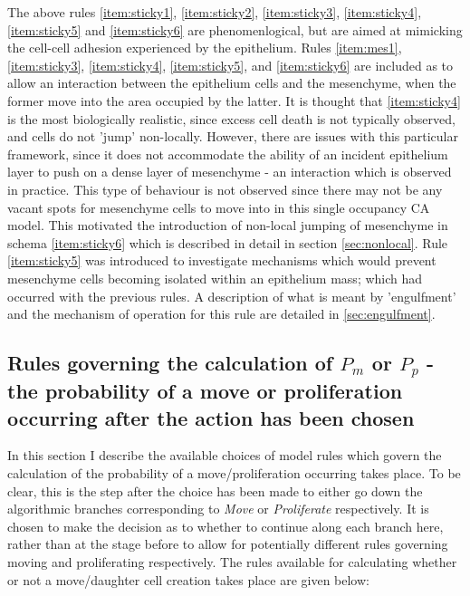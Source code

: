 \documentclass[pdftex,10pt,a4paper]{article}
\begin{document}
The above rules \ref{item:sticky1}, \ref{item:sticky2}, \ref{item:sticky3}, \ref{item:sticky4},\ref{item:sticky5} and \ref{item:sticky6} are phenomenlogical, but are aimed at mimicking the cell-cell adhesion experienced by the epithelium. Rules \ref{item:mes1}, \ref{item:sticky3}, \ref{item:sticky4}, \ref{item:sticky5}, and \ref{item:sticky6} are included as to allow an interaction between the epithelium cells and the mesenchyme, when the former move into the area occupied by the latter. It is thought that \ref{item:sticky4} is the most biologically realistic, since excess cell death is not typically observed, and cells do not 'jump' non-locally. However, there are issues with this particular framework, since it does not accommodate the ability of an incident epithelium layer to push on a dense layer of mesenchyme - an interaction which is observed in practice. This type of behaviour is not observed since there may not be any vacant spots for mesenchyme cells to move into in this single occupancy CA model. This motivated the introduction of non-local jumping of mesenchyme in schema \ref{item:sticky6} which is described in detail in section \ref{sec:nonlocal}. Rule \ref{item:sticky5} was introduced to investigate mechanisms which would prevent mesenchyme cells becoming isolated within an epithelium mass; which had occurred with the previous rules. A description of what is meant by 'engulfment' and the mechanism of operation for this rule are detailed in \ref{sec:engulfment}.

\subsection{Rules governing the calculation of $P_{m}$ or $P_p$ - the probability of a move or proliferation occurring after the action has been chosen}\label{sec:rule_pmove}
In this section I describe the available choices of model rules which govern the calculation of the probability of a move/proliferation occurring takes place. To be clear, this is the step after the choice has been made to either go down the algorithmic branches corresponding to \textit{Move} or \textit{Proliferate} respectively. It is chosen to make the decision as to whether to continue along each branch here, rather than at the stage before to allow for potentially different rules governing moving and proliferating respectively. The rules available for calculating whether or not a move/daughter cell creation takes place are given below:
\end{document}
